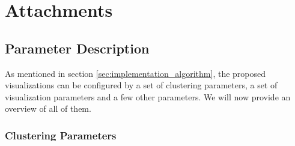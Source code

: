 \chapter{Attachments}

\section{Parameter Description}
\label{sec:parameter_description}

As mentioned in section \ref{sec:implementation_algorithm}, the proposed visualizations can be configured by a set of clustering parameters, a set of visualization parameters and a few other parameters. We will now provide an overview of all of them.

\subsection{Clustering Parameters}

